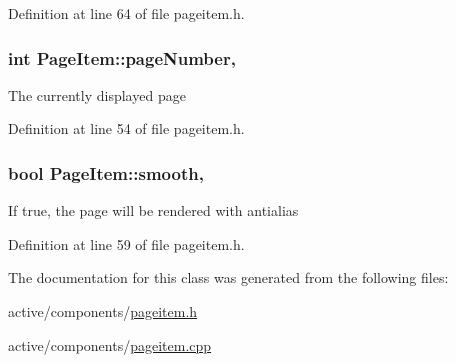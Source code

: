 Definition at line 64 of file pageitem.\+h.

\hypertarget{classPageItem_a01146d83f23d53bca72bfd69373c794a}{
\subsubsection[{page\+Number}]{\setlength{\rightskip}{0pt plus 5cm}int Page\+Item\+::page\+Number\hspace{0.3cm}{\ttfamily [read]}, {\ttfamily [write]}}}\label{classPageItem_a01146d83f23d53bca72bfd69373c794a}
The currently displayed page 

Definition at line 54 of file pageitem.\+h.

\hypertarget{classPageItem_a790f5adc2ae400da2f113d06e5fbb960}{
\subsubsection[{smooth}]{\setlength{\rightskip}{0pt plus 5cm}bool Page\+Item\+::smooth\hspace{0.3cm}{\ttfamily [read]}, {\ttfamily [write]}}}\label{classPageItem_a790f5adc2ae400da2f113d06e5fbb960}
If true, the page will be rendered with antialias 

Definition at line 59 of file pageitem.\+h.



The documentation for this class was generated from the following files\+:\begin{DoxyCompactItemize}
\item 
active/components/\hyperlink{pageitem_8h}{pageitem.\+h}\item 
active/components/\hyperlink{pageitem_8cpp}{pageitem.\+cpp}\end{DoxyCompactItemize}
